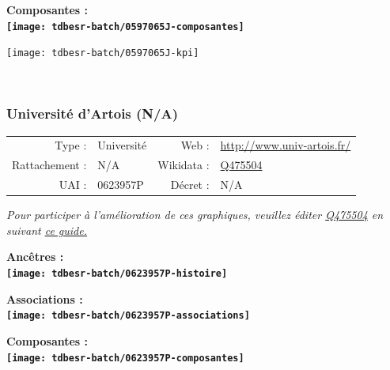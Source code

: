 \documentclass[12pt,french,]{article}
\begin{document}
\hrulefill

\begin{center} \bf Composantes : \\  
\texttt{[image: tdbesr-batch/0597065J-composantes]} \end{center}

\begin{center}\texttt{[image: tdbesr-batch/0597065J-kpi]} \end{center}\checkoddpage

\ifoddpage ~\newpage \fi   

\hypertarget{universituxe9-dartois-na}{%
\subsubsection{Université d'Artois
(N/A)}\label{universituxe9-dartois-na}}

\begin{tabular*}{\textwidth}{rp{5cm}rl}  
\hline  
Type : & Université & Web : &\href{http://www.univ-artois.fr/}{http://www.univ-artois.fr/} \\  
Rattachement : & N/A & Wikidata : & \href{https://www.wikidata.org/entity/Q475504}{Q475504} \\  
UAI : & 0623957P & Décret : & N/A \\  
\hline  
\end{tabular*}

\textit{\scriptsize Pour participer à l'amélioration de ces graphiques, veuillez éditer  \href{https://www.wikidata.org/entity/Q475504}{Q475504}  en suivant \href{https://github.com/cpesr/wikidataESR/blob/master/Rmd/wikidataESR.md}{ce guide.}}

\vspace{1cm}  
\begin{minipage}[b]{0.50\textwidth}\begin{center} \bf Ancêtres : \\  
\texttt{[image: tdbesr-batch/0623957P-histoire]} \end{center}\end{minipage}\begin{minipage}[b]{0.50\textwidth}\begin{center} \bf Associations : \\  
\texttt{[image: tdbesr-batch/0623957P-associations]} \end{center}\end{minipage}

\hrulefill

\begin{center} \bf Composantes : \\  
\texttt{[image: tdbesr-batch/0623957P-composantes]} \end{center}
\end{document}
